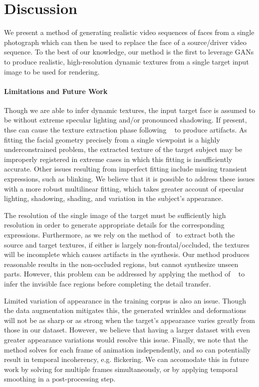 
\section{Discussion}

We present a method of generating realistic video sequences of faces from a single photograph 
which can then be used to replace the face of a source/driver video sequence. 
To the best of our knowledge, our method is the first
to leverage GANs to produce realistic, high-resolution dynamic textures from a single target input image to be used for rendering.  

\paragraph{Limitations and Future Work}
Though we are able to infer dynamic textures, the input target face is assumed to be without extreme specular lighting and/or pronounced shadowing. If present, thse can cause the texture extraction phase following ~\cite{f2f} to produce artifacts. As fitting the facial geometry precisely from a single viewpoint is a highly underconstrained problem, the extracted texture of the target subject may be improperly registered in extreme cases in which this fitting is insufficiently accurate. Other issues resulting from imperfect fitting include missing transient expressions, such as blinking. We believe that it is possible to address these issues with a more robust multilinear fitting, which takes greater account of specular lighting, shadowing, shading, and variation in the subject's appearance.   

The resolution of the single image of the target must be sufficiently high resolution in order to generate appropriate details for the corresponding expressions. Furthermore, as we rely on the method of~\cite{f2f} to extract both the source and target textures, if either is largely non-frontal/occluded, the textures will be incomplete which causes artifacts in the synthesis.  Our method produces reasonable results in the non-occluded regions, but cannot synthesize unseen parts. However, this problem can be addressed by applying the method of ~\cite{saito2016} to infer the invisible face regions before completing the detail transfer.  


Limited variation of appearance in the training corpus is also an issue.  Though the data augmentation mitigates this, the generated wrinkles and deformations will not be as sharp or as strong when the target's appearance varies greatly from those in our dataset.  However, we believe that having a larger dataset with even greater appearance variations would resolve this issue. Finally, we note that the method solves for each frame of animation independently, and so can potentially result in temporal incoherency, e.g. flickering.  We can accomodate this in future work by solving for multiple frames simultaneously, or by applying temporal smoothing in a post-processing step.  

\vfill\eject

